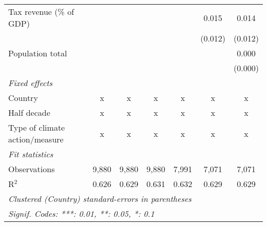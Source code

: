 \begin{tabular}{lcccccc}
   Tax revenue (\% of GDP)                                                                             &         &               &                &                & 0.015          & 0.014\\   
                                                                                                       &         &               &                &                & (0.012)        & (0.012)\\   
   Population total                                                                                    &         &               &                &                &                & 0.000\\   
                                                                                                       &         &               &                &                &                & (0.000)\\   
   \emph{Fixed effects}\\
   Country                                                                                             & x       & x             & x              & x              & x              & x\\  
   Half decade                                                                                         & x       & x             & x              & x              & x              & x\\  
   Type of climate action/measure                                                                      & x       & x             & x              & x              & x              & x\\  
   \midrule \emph{Fit statistics}\\
   Observations                                                                                        & 9,880   & 9,880         & 9,880          & 7,991          & 7,071          & 7,071\\  
   R$^2$                                                                                               & 0.626   & 0.629         & 0.631          & 0.632          & 0.629          & 0.629\\  
   \midrule
   \multicolumn{7}{l}{\emph{Clustered (Country) standard-errors in parentheses}}\\
   \multicolumn{7}{l}{\emph{Signif. Codes: ***: 0.01, **: 0.05, *: 0.1}}\\
\end{tabular}
\par\endgroup


